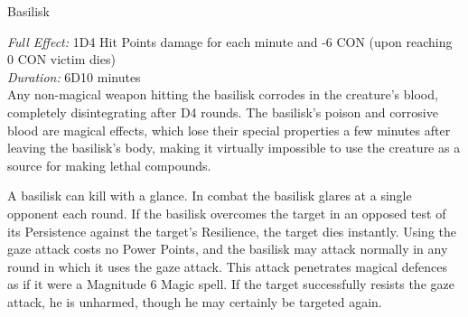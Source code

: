 \begin{monsterbox}{Basilisk}
\begin{rpg-monsteraction}
		\textit{Full Effect:} 1D4 Hit Points damage for each minute and -6 CON (upon reaching 0 CON victim dies)\\ 
		\textit{Duration:} 6D10 minutes\\
		Any non-magical weapon hitting the basilisk corrodes in the creature’s blood, completely disintegrating after D4 rounds. The basilisk’s poison and corrosive blood are magical effects, which lose their special properties a few minutes after leaving the basilisk’s body, making it virtually impossible to use the creature as a source for making lethal compounds.
	\end{rpg-monsteraction}
	\begin{rpg-monsteraction}
		A basilisk can kill with a glance. In combat the basilisk glares at a single opponent each round. If the basilisk overcomes the target in an opposed test of its Persistence against the target’s Resilience, the target dies instantly. Using the gaze attack costs no Power Points, and the basilisk may attack normally in any round in which it uses the gaze attack. This attack penetrates magical defences as if it were a Magnitude 6 Magic spell. If the target successfully resists the gaze attack, he is unharmed, though he may certainly be targeted again. 
	\end{rpg-monsteraction}

\end{monsterbox}

\newpage

